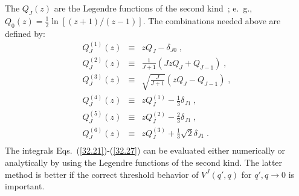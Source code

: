 The $Q_J(z)$ are the Legendre functions of the second 
kind~\cite{AS70}; e.~g., $Q_0(z)=\frac12 \ln [(z+1)/(z-1)]$.
The combinations needed above are defined by:
\begin{eqnarray}
Q^{(1)}_J(z) & \equiv & zQ_J-\delta_{J0}
\; ,
\label{eq_QJ1} \\
Q^{(2)}_J(z) & \equiv & \frac{1}{J+1} ( JzQ_J+Q_{J-1} )
\; ,
\label{eq_QJ2} \\
Q^{(3)}_J(z) & \equiv & \sqrt{\frac{J}{J+1}} ( zQ_J-Q_{J-1} )
\; ,
\label{eq_QJ3} \\
Q^{(4)}_J(z) & \equiv & zQ_J^{(1)}-\frac13\delta_{J1}
\; ,
\label{eq_QJ4} \\
Q^{(5)}_J(z) & \equiv & zQ_J^{(2)}-\frac23\delta_{J1}
\; ,
\label{eq_QJ5} \\
Q^{(6)}_J(z) & \equiv & zQ_J^{(3)}+\frac13\sqrt{2}\delta_{J1}
\; .
\label{eq_QJ6} \\
\end{eqnarray}
The integrals
Eqs.~(\ref{32.21})-(\ref{32.27}) can be evaluated either numerically
or analytically by using the Legendre functions of the second kind.
The latter method is better if the correct threshold behavior
of $V^J(q',q)$ for $q',q \rightarrow 0$ is important.

